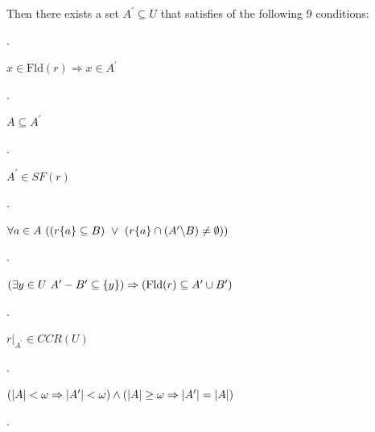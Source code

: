 \documentclass[10pt,a4paper]{amsart}
\begin{document}
Then there exists a set $A^{\prime}\subseteq U$ that satisfies of the following 9 conditions:\par
  
\par{}. 
 
$x\in\mathrm{Fld}(r)\Rightarrow x\in A^{\prime}$\par
 
 
 
\par{}. 
 
$A\subseteq A^{\prime}$\par
 
 
 
\par{}. 
 
$A^{\prime}\in SF(r)$\par
 
 
 
\par{}. 
 
$\forall a\in A\leavevmode\nobreak\ ((r\{a\}\subseteq B)\leavevmode\nobreak\ %
\vee\leavevmode\nobreak\ (r\{a\}\cap(A^{\prime}\backslash B)\neq\emptyset))$\par
 
 
 
\par{}. 
 
$(\exists y\in U\leavevmode\nobreak\ A^{\prime}-B^{\prime}\subseteq\{y\})%
\Rightarrow(\mathrm{Fld}(r)\subseteq A^{\prime}\cup B^{\prime})$\par
 
 
 
\par{}. 
 
$r|_{A^{\prime}}\in CCR(U)$\par
 
 
 
\par{}. 
 
$(|A|<\omega\Rightarrow|A^{\prime}|<\omega)\wedge(|A|\geq\omega\Rightarrow|A^{%
\prime}|=|A|)$\par
 
 
 
\par{}. 
 
\end{document}
